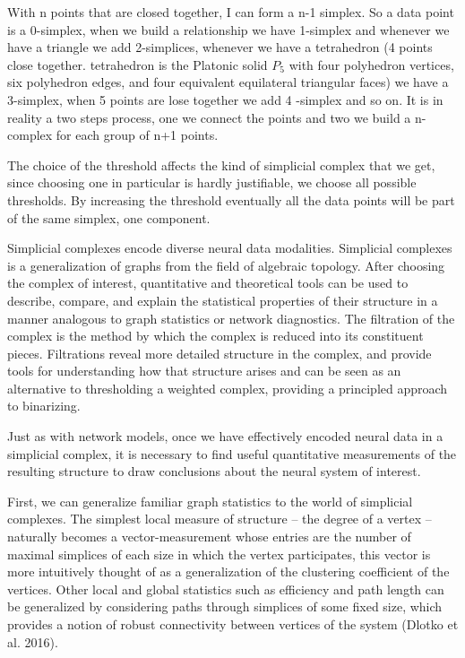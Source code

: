 \documentclass[onecollarge,runningheads]{svjour2}
\begin{document}
With n points that are closed together, I can form a n-1 simplex. So a data point is a 0-simplex, when we build a relationship we have 1-simplex and whenever we have a triangle we add 2-simplices, whenever we have a tetrahedron (4 points close together.  tetrahedron is the Platonic solid $P_5$ with four polyhedron vertices, six polyhedron edges, and four equivalent equilateral triangular faces) we have a 3-simplex, when 5 points are lose together we add 4 -simplex and so on.
It is in reality a two steps process, one we connect the points and two we build a n-complex for each group of n+1 points.

The choice of the threshold affects the kind of simplicial complex that we get, since choosing one in particular is hardly justifiable, we choose all possible thresholds. By increasing the threshold eventually all the data points will be part of the same simplex, one component.

Simplicial complexes encode diverse neural data modalities. Simplicial complexes is a generalization of graphs from the field of algebraic topology.  After choosing the complex of interest, quantitative and theoretical tools can be used to describe, compare, and explain the statistical properties of their structure in a manner analogous to graph statistics or network diagnostics.
The filtration of the complex is the method by which the complex is reduced into its constituent pieces. Filtrations reveal more detailed structure in the complex, and provide tools for understanding how that structure arises and can be seen as an alternative to thresholding a weighted complex, providing a principled approach to binarizing.

Just as with network models, once we have effectively encoded neural data in a simplicial complex, it is necessary to find useful quantitative measurements of the resulting structure to draw conclusions about the neural system of interest.

First, we can generalize familiar graph statistics to the world of simplicial complexes. The simplest local measure of structure – the degree of a vertex – naturally becomes a vector-measurement whose entries are the number of maximal simplices of each size in which the vertex participates, this vector is more intuitively thought of as a generalization of the clustering coefficient of the vertices. Other local and global statistics such as efficiency and path length can be generalized by considering paths through simplices of some fixed size, which provides a notion of robust connectivity between vertices of the system (Dlotko et al. 2016).
\end{document}
